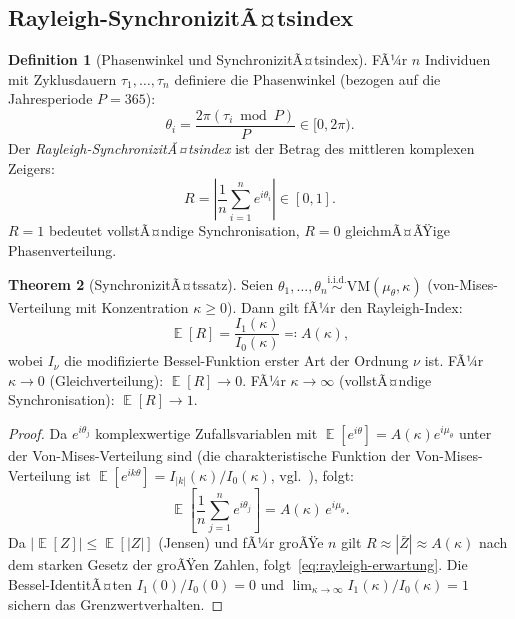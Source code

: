 ﻿\documentclass[12pt, a4paper]{article}
\theoremstyle{definition}
\newtheorem{theorem}{Theorem}[section]
\newtheorem{definition}[theorem]{Definition}
\DeclareMathOperator{\E}{\mathbb{E}}
\begin{document}
\subsection{Rayleigh-SynchronizitÃ¤tsindex}

\begin{definition}[Phasenwinkel und SynchronizitÃ¤tsindex]\label{def:rayleigh}
FÃ¼r $n$ Individuen mit Zyklusdauern $\tau_1, \ldots, \tau_n$ definiere die
Phasenwinkel (bezogen auf die Jahresperiode $P = 365$):
\[
  \theta_i = \frac{2\pi (\tau_i \bmod P)}{P} \in [0, 2\pi).
\]
Der \emph{Rayleigh-SynchronizitÃ¤tsindex} ist der Betrag des mittleren komplexen
Zeigers:
\begin{equation}\label{eq:rayleigh}
  R = \left|\frac{1}{n}\sum_{i=1}^n e^{i\theta_i}\right| \in [0, 1].
\end{equation}
$R = 1$ bedeutet vollstÃ¤ndige Synchronisation, $R = 0$ gleichmÃ¤ÃŸige Phasenverteilung.
\end{definition}

\begin{theorem}[SynchronizitÃ¤tssatz]\label{thm:synchronizitaet}
Seien $\theta_1, \ldots, \theta_n \overset{\text{i.i.d.}}{\sim} \mathrm{VM}(\mu_\theta, \kappa)$
(von-Mises-Verteilung mit Konzentration $\kappa \geq 0$). Dann gilt fÃ¼r den
Rayleigh-Index:
\begin{equation}\label{eq:rayleigh-erwartung}
  \E[R] = \frac{I_1(\kappa)}{I_0(\kappa)} \eqqcolon A(\kappa),
\end{equation}
wobei $I_\nu$ die modifizierte Bessel-Funktion erster Art der Ordnung $\nu$ ist.
FÃ¼r $\kappa \to 0$ (Gleichverteilung): $\E[R] \to 0$. FÃ¼r $\kappa \to \infty$
(vollstÃ¤ndige Synchronisation): $\E[R] \to 1$.
\end{theorem}

\begin{proof}
Da $e^{i\theta_j}$ komplexwertige Zufallsvariablen mit $\E[e^{i\theta}] = A(\kappa) e^{i\mu_\theta}$
unter der Von-Mises-Verteilung sind (die charakteristische Funktion der
Von-Mises-Verteilung ist $\E[e^{ik\theta}] = I_{|k|}(\kappa)/I_0(\kappa)$,
vgl.~\cite{Mardia1972}), folgt:
\[
  \E\!\left[\frac{1}{n}\sum_{j=1}^n e^{i\theta_j}\right] = A(\kappa)\,e^{i\mu_\theta}.
\]
Da $\left|\E[Z]\right| \leq \E[|Z|]$ (Jensen) und fÃ¼r groÃŸe $n$ gilt
$R \approx \left|\bar{Z}\right| \approx A(\kappa)$ nach dem starken Gesetz der
groÃŸen Zahlen, folgt~\eqref{eq:rayleigh-erwartung}. Die Bessel-IdentitÃ¤ten
$I_1(0)/I_0(0) = 0$ und $\lim_{\kappa\to\infty} I_1(\kappa)/I_0(\kappa) = 1$
sichern das Grenzwertverhalten. \hfill
\end{proof}
\end{document}
